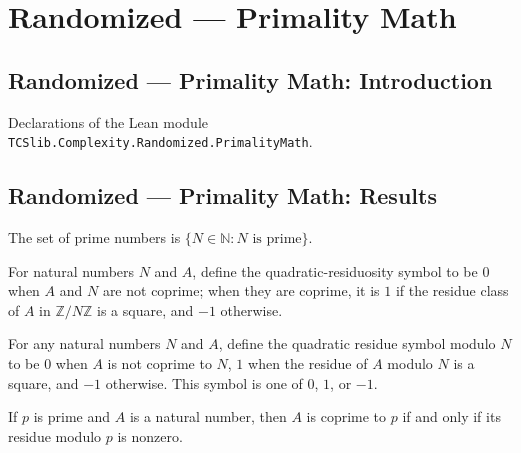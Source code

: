 \section{Randomized --- Primality Math}
\subsection*{Randomized --- Primality Math: Introduction}

Declarations of the Lean module \texttt{TCSlib.Complexity.Randomized.PrimalityMath}.

\subsection*{Randomized --- Primality Math: Results}

\begin{definition}
\label{Randomized.PRIMES}
\leanok
The set of prime numbers is $\{N\in\mathbb{N}:N\text{ is prime}\}$.
\end{definition}

\begin{definition}
\label{Randomized.qrSymbol}
\leanok
For natural numbers $N$ and $A$, define the quadratic-residuosity symbol to be $0$ when
$A$ and $N$ are not coprime; when they are coprime, it is $1$ if the residue class of
$A$ in $\mathbb{Z}/N\mathbb{Z}$ is a square, and $-1$ otherwise.
\end{definition}

\begin{theorem}
\label{Randomized.qrSymbol_trichotomy}
\leanok
{}
For any natural numbers $N$ and $A$, define the quadratic residue symbol modulo $N$ to
be $0$ when $A$ is not coprime to $N$, $1$ when the residue of $A$ modulo $N$ is a
square, and $-1$ otherwise. This symbol is one of $0$, $1$, or $-1$.
\end{theorem}

\begin{theorem}
\label{Randomized.coprime_iff_natCast_ne_zero}
\leanok
{}
If $p$ is prime and $A$ is a natural number, then $A$ is coprime to $p$ if and only if
its residue modulo $p$ is nonzero.
\end{theorem}

